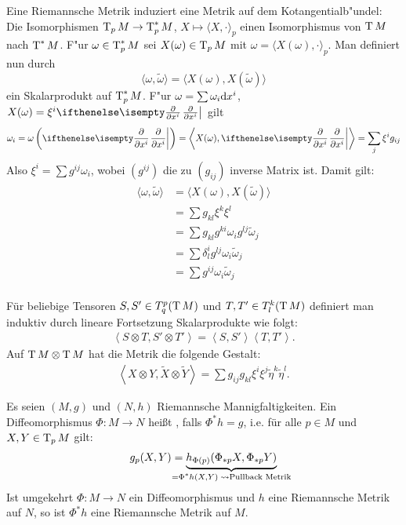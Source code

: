 Eine Riemannsche Metrik induziert eine Metrik auf dem Kotangentialb"undel: Die Isomorphismen $\operatorname{T}_pM \to \operatorname{T}_p^*M$, $X \mapsto \langle X, \cdot \rangle_p$ einen Isomorphismus von $\operatorname{T} M$ nach $\operatorname{T}^*M$. F"ur $\omega \in \operatorname{T}_p^*M$ sei $X(\omega) \in \operatorname{T}_pM$ mit $\omega = \langle X(\omega), \cdot \rangle_p$. Man definiert nun durch
	\[ \langle \omega, \tilde \omega \rangle = \langle X(\omega), X(\tilde \omega) \rangle \]
ein Skalarprodukt auf $\operatorname{T}_p^*M$. F"ur $\omega = \sum \omega_i \mathrm{d} x^{i}$, $X(\omega) = \xi^{i} \pdifffrac{}{x^{i}}$ gilt
	\[ \omega_i = \omega \left( \pdifffrac{}{x^{i}} \right) = \left\langle X(\omega), \pdifffrac{}{x^{i}} \right\rangle = \sum_j \xi^{i} g_{ij} \]
Also $\xi^{i} = \sum g^{ij} \omega_i$, wobei $(g^{ij})$ die zu $(g_{ij})$ inverse Matrix ist. Damit gilt:
\begin{align*}
	\langle \omega, \tilde \omega \rangle &= \langle X(\omega), X(\tilde \omega) \rangle \\
	&= \sum g_{kl} \xi^k \xi^l\\
	&= \sum g_{kl} g^{ki} \omega_i g^{lj} \tilde \omega_j\\
	&= \sum \delta_l^i g^{lj} \omega_i \tilde \omega_j\\
	&= \sum g^{ij} \omega_i \tilde \omega_j\\
\end{align*}



Für beliebige Tensoren $S, S' \in T_q^p(\operatorname{T} M)$ und $T, T' \in T_l^k(\operatorname{T} M)$ definiert man induktiv durch lineare Fortsetzung Skalarprodukte wie folgt:
\begin{align*}
  \left<S \otimes T, S' \otimes T'\right> = \left<S,S'\right>\left<T,T'\right>.
\end{align*}
Auf $\operatorname{T} M \otimes \operatorname{T} M$ hat die Metrik die folgende Gestalt:
\begin{align*}
  \left<X \otimes Y,\tilde X \otimes \tilde Y\right> = \sum g_{ij}g_{kl}\xi^i\xi^j\tilde\eta^k\tilde\eta^l.
\end{align*}

\begin{Dfn}
  Es seien $(M, g)$ und $(N,h)$ Riemannsche Mannigfaltigkeiten.
Ein Diffeomorphismus $\Phi \colon M \to N$ heißt , falls $\Phi^{*}h = g$, i.e. für alle $p \in M$ und $X,Y \in \operatorname{T}_pM$ gilt:
\begin{align*}
  g_p(X,Y) = \underbrace{h_{\Phi(p)}(\Phi_{*p}X,\Phi_{*p}Y)}_{\mathclap{= \Phi^{*}h(X,Y) \; \rightsquigarrow \text{Pullback Metrik}}}
\end{align*}
Ist umgekehrt $\Phi \colon M \to N$ ein Diffeomorphismus und $h$ eine Riemannsche Metrik auf $N$, so ist $\Phi^{*}h$ eine Riemannsche Metrik auf $M$.
\end{Dfn}

